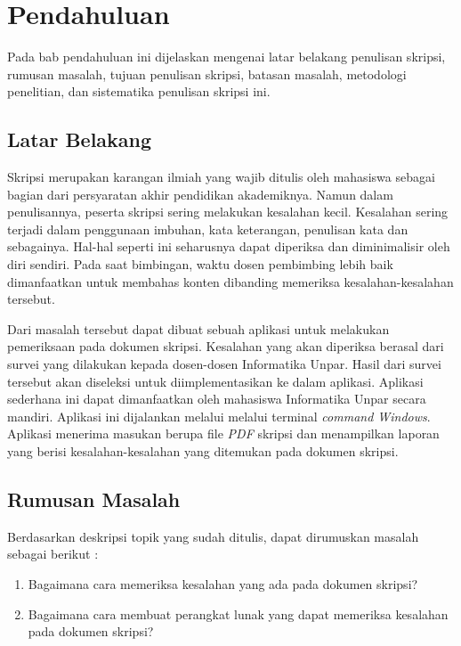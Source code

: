 \chapter{Pendahuluan}
\label{chap:intro}
   
Pada bab pendahuluan ini dijelaskan mengenai latar belakang penulisan skripsi, rumusan masalah, tujuan penulisan skripsi, batasan masalah, metodologi penelitian, dan sistematika penulisan skripsi ini.

\section{Latar Belakang}
\label{sec:label}

Skripsi merupakan karangan ilmiah yang wajib ditulis oleh mahasiswa sebagai bagian dari persyaratan akhir pendidikan akademiknya. Namun dalam penulisannya, peserta skripsi sering melakukan kesalahan kecil. Kesalahan sering terjadi dalam penggunaan imbuhan, kata keterangan, penulisan kata dan sebagainya. Hal-hal seperti ini seharusnya dapat diperiksa dan diminimalisir oleh diri sendiri. Pada saat bimbingan, waktu dosen pembimbing lebih baik dimanfaatkan untuk membahas konten dibanding memeriksa kesalahan-kesalahan tersebut.

Dari masalah tersebut dapat dibuat sebuah aplikasi untuk melakukan pemeriksaan pada dokumen skripsi. Kesalahan yang akan diperiksa berasal dari survei yang dilakukan kepada dosen-dosen Informatika Unpar. Hasil dari survei tersebut akan diseleksi untuk diimplementasikan ke dalam aplikasi. Aplikasi sederhana ini dapat dimanfaatkan oleh mahasiswa Informatika Unpar secara mandiri. Aplikasi ini dijalankan melalui melalui terminal \textit{command Windows}. Aplikasi menerima masukan berupa file \textit{PDF} skripsi dan menampilkan laporan yang berisi kesalahan-kesalahan yang ditemukan pada dokumen skripsi. 


\section{Rumusan Masalah}
\label{sec:rumusan}
Berdasarkan deskripsi topik yang sudah ditulis, dapat dirumuskan masalah sebagai berikut :
\begin{enumerate}
	\item Bagaimana cara memeriksa kesalahan yang ada pada dokumen skripsi?
	\item Bagaimana cara membuat perangkat lunak yang dapat memeriksa kesalahan pada dokumen skripsi?
\end{enumerate}

